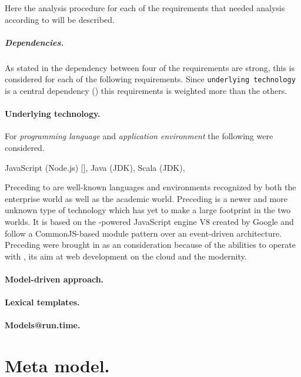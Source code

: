 Here the analysis procedure for each of the requirements 
that needed analysis according to  will be described.

\subparagraph{Dependencies.}

As stated in  the dependency between four of the requirements
are strong, this is considered for each of the following requirements.
Since \texttt{underlying technology} is a central dependency ()
this requirements is weighted more than the others.

\paragraph{Underlying technology.}

For \emph{programming language} and \emph{application environment} the following were considered.
\begin{ii}
  \iitem JavaScript (Node.js) [],
  \iitem Java (JDK),
  \iitem Scala (JDK),
\end{ii}
Preceding  to  are well-known languages and environments recognized by both the enterprise world as well as the academic world.
Preceding  is a newer and more unknown type of technology which has yet to 
make a large footprint in the two worlds. 
It is based on the -powered JavaScript engine V8 created by Google and follow a 
CommonJS-based module pattern over an event-driven architecture.
Preceding  were brought in as an consideration because of the abilities to operate
with , its aim at web development on the cloud and the modernity.

\paragraph{Model-driven approach.}

\paragraph{Lexical templates.}

\paragraph{Models@run.time.}

\section{Meta model.}


